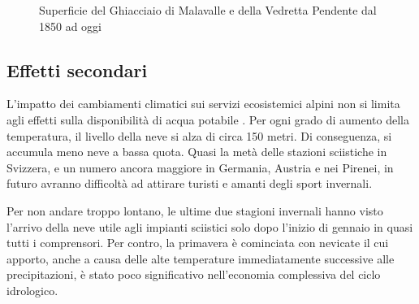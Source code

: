 \documentclass[14pt,a4paper]{article}
\begin{document}
		
		\begin{figure}[p!]
		\caption{Superficie del Ghiacciaio di Malavalle e della Vedretta Pendente dal 1850 ad oggi}
		\label{diag:ridanna}
	\end{figure}
		
	\subsection{Effetti secondari}
		L'impatto dei cambiamenti climatici sui servizi ecosistemici alpini non si limita agli effetti sulla disponibilità di acqua potabile \cite{LeAlpi}. Per ogni grado di aumento della temperatura, il livello della neve si alza di circa 150 metri. Di conseguenza, si accumula meno neve a bassa quota. Quasi la metà delle stazioni sciistiche in Svizzera, e un numero ancora maggiore in Germania, Austria e nei Pirenei, in futuro avranno difficoltà ad attirare turisti e amanti degli sport invernali.
		
		Per non andare troppo lontano, le ultime due stagioni invernali hanno visto l'arrivo della neve utile agli impianti sciistici solo dopo l'inizio di gennaio in quasi tutti i comprensori. Per contro, la primavera è cominciata con nevicate il cui apporto, anche a causa delle alte temperature immediatamente successive alle precipitazioni, è stato poco significativo nell'economia complessiva del ciclo idrologico.
		
\end{document}
